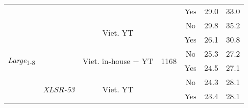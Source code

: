 \begin{table}[!ht]
\begin{adjustbox}{width=0.7\columnwidth,center}
\begin{tabular}{|c|c|c|c|c|c|c|}
\cline{5-7}
                                   &                                    &                                      &                       & Yes                      & 29.0       & 33.0              \\ 
\cline{1-1}\cline{3-7}
\multirow{6}{*}{\textit{Large}\textsubscript{1-8}} &                                    & \multirow{2}{*}{Viet. YT}            & \multirow{6}{*}{1168} & No                       & 29.8       & 35.2              \\ 
\cline{5-7}
                                   &                                    &                                      &                       & Yes                      & 26.1       & 30.8              \\ 
\cline{3-3}\cline{5-7}
                                   &                                    & \multirow{2}{*}{Viet. in-house + YT} &                       & No                       & 25.3       & 27.2              \\ 
\cline{5-7}
                                   &                                    &                                      &                       & Yes                      & 24.5       & 27.1              \\ 
\cline{2-3}\cline{5-7}
                                   & \multirow{2}{*}{\textit{XLSR-53}}  & \multirow{2}{*}{Viet. YT}            &                       & No                       & 24.3       & 28.1              \\ 
\cline{5-7}
                                   &                                    &                                      &                       & Yes                      & 23.4       & 28.1              \\
\hline
\end{tabular}
\end{adjustbox}
\caption{
    }
\label{table:if_loss_hykist_pos}
\end{table}